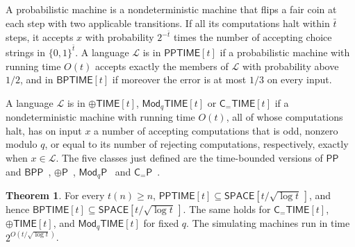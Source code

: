 \documentclass[11pt]{article}
\theoremstyle{definition}
\newtheorem{theorem}{Theorem}[section]
\theoremstyle{definition}
\theoremstyle{remark}
\newcommand{\SPACE}{\mathsf{SPACE}}
\newcommand{\BPTIME}{\mathsf{BPTIME}}
\newcommand{\PPTIME}{\mathsf{PPTIME}}
\newcommand{\ParTIME}{\oplus\mathsf{TIME}}
\newcommand{\ModTIME}{\mathsf{Mod}_q\mathsf{TIME}}
\newcommand{\CeqTIME}{\mathsf{C}_{=}\mathsf{TIME}}
\begin{document}
A probabilistic machine is a nondeterministic machine that flips a fair coin at each step with two applicable transitions. If all its computations halt within $\bar t$ steps, it accepts $x$ with probability $2^{-\bar t}$ times the number of accepting choice strings in $\{0,1\}^{\bar t}$. A language $\mathcal L$ is in $\PPTIME[t]$ if a probabilistic machine with running time $O(t)$ accepts exactly the members of $\mathcal L$ with probability above $1/2$, and in $\BPTIME[t]$ if moreover the error is at most $1/3$ on every input.

A language $\mathcal L$ is in $\ParTIME[t]$, $\ModTIME[t]$ or $\CeqTIME[t]$ if a nondeterministic machine with running time $O(t)$, all of whose computations halt, has on input $x$ a number of accepting computations that is odd, nonzero modulo $q$, or equal to its number of rejecting computations, respectively, exactly when $x\in\mathcal L$. The five classes just defined are the time-bounded versions of $\mathsf{PP}$ and $\mathsf{BPP}$~\cite{Gil77}, $\oplus\mathsf P$~\cite{PZ83}, $\mathsf{Mod}_q\mathsf P$~\cite{BG92} and $\mathsf C_=\mathsf P$~\cite{Wag86}.

\begin{theorem}\label{thm:counting-classes}
For every $t(n)\ge n$, $\PPTIME[t]\subseteq\SPACE[t/\sqrt{\log t}\,]$, and hence $\BPTIME[t]\subseteq\SPACE[t/\sqrt{\log t}\,]$. The same holds for $\CeqTIME[t]$, $\ParTIME[t]$, and $\ModTIME[t]$ for fixed $q$. The simulating machines run in time $2^{O(t/\sqrt{\log t})}$.
\end{theorem}
\end{document}
